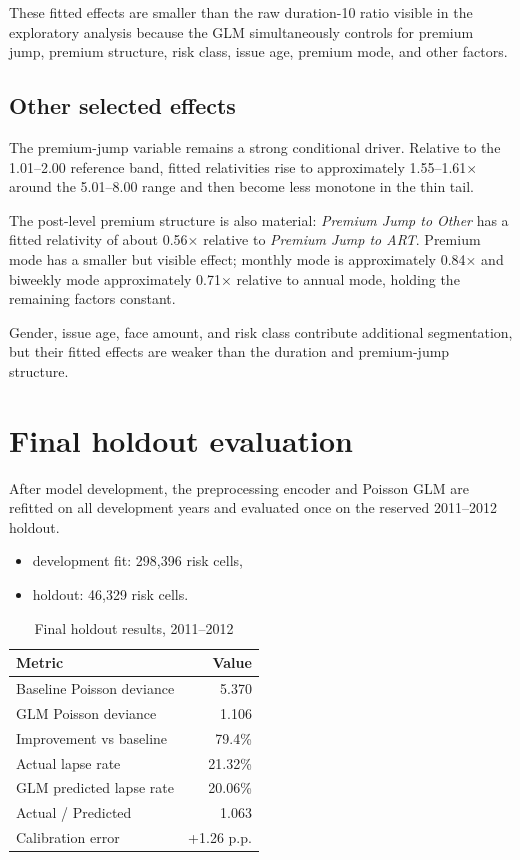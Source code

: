 \documentclass[11pt,a4paper]{article}
\theoremstyle{definition}
\begin{document}
These fitted effects are smaller than the raw duration-10 ratio visible in the exploratory analysis because the GLM simultaneously controls for premium jump, premium structure, risk class, issue age, premium mode, and other factors.

\subsection{Other selected effects}
The premium-jump variable remains a strong conditional driver. Relative to the 1.01--2.00 reference band, fitted relativities rise to approximately 1.55--1.61$\times$ around the 5.01--8.00 range and then become less monotone in the thin tail.

The post-level premium structure is also material: \textit{Premium Jump to Other} has a fitted relativity of about 0.56$\times$ relative to \textit{Premium Jump to ART}. Premium mode has a smaller but visible effect; monthly mode is approximately 0.84$\times$ and biweekly mode approximately 0.71$\times$ relative to annual mode, holding the remaining factors constant.

Gender, issue age, face amount, and risk class contribute additional segmentation, but their fitted effects are weaker than the duration and premium-jump structure.

\section{Final holdout evaluation}
After model development, the preprocessing encoder and Poisson GLM are refitted on all development years and evaluated once on the reserved 2011--2012 holdout.

\begin{itemize}
\item development fit: 298,396 risk cells,
\item holdout: 46,329 risk cells.
\end{itemize}

\begin{table}[H]
\centering
\caption{Final holdout results, 2011--2012}
\begin{tabular}{lr}
\toprule
Metric & Value \\
\midrule
Baseline Poisson deviance & 5.370 \\
GLM Poisson deviance & 1.106 \\
Improvement vs baseline & 79.4\% \\
Actual lapse rate & 21.32\% \\
GLM predicted lapse rate & 20.06\% \\
Actual / Predicted & 1.063 \\
Calibration error & +1.26 p.p. \\
\bottomrule
\end{tabular}
\end{table}
\end{document}

